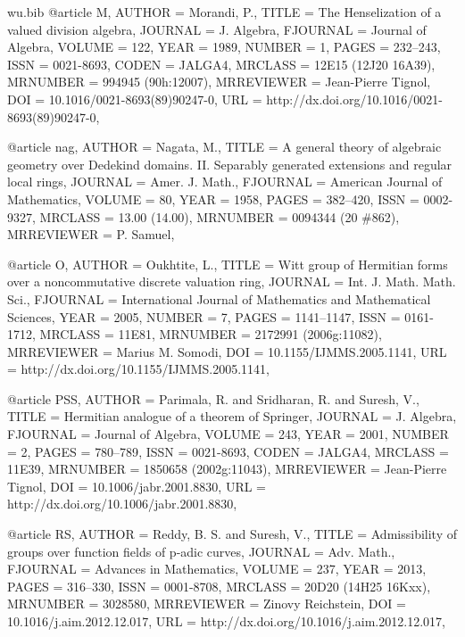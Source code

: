 \documentclass{amsart}
\numberwithin{equation}{section}
\theoremstyle{plain}
\theoremstyle{definition}
\begin{document}
\begin{filecontents}{wu.bib}
@article {M, 
    AUTHOR = {Morandi, P.},
     TITLE = {The {H}enselization of a valued division algebra},
   JOURNAL = {J. Algebra},
  FJOURNAL = {Journal of Algebra},
    VOLUME = {122},
      YEAR = {1989},
    NUMBER = {1},
     PAGES = {232--243},
      ISSN = {0021-8693},
     CODEN = {JALGA4},
   MRCLASS = {12E15 (12J20 16A39)},
  MRNUMBER = {994945 (90h:12007)},
MRREVIEWER = {Jean-Pierre Tignol},
       DOI = {10.1016/0021-8693(89)90247-0},
       URL = {http://dx.doi.org/10.1016/0021-8693(89)90247-0},
}

@article {nag,
    AUTHOR = {Nagata, M.},
     TITLE = {A general theory of algebraic geometry over {D}edekind
              domains. {II}. {S}eparably generated extensions and regular
              local rings},
   JOURNAL = {Amer. J. Math.},
  FJOURNAL = {American Journal of Mathematics},
    VOLUME = {80},
      YEAR = {1958},
     PAGES = {382--420},
      ISSN = {0002-9327},
   MRCLASS = {13.00 (14.00)},
  MRNUMBER = {0094344 (20 \#862)},
MRREVIEWER = {P. Samuel},
}

@article {O, 
    AUTHOR = {Oukhtite, L.},
     TITLE = {Witt group of {H}ermitian forms over a noncommutative discrete
              valuation ring},
   JOURNAL = {Int. J. Math. Math. Sci.},
  FJOURNAL = {International Journal of Mathematics and Mathematical
              Sciences},
      YEAR = {2005},
    NUMBER = {7},
     PAGES = {1141--1147},
      ISSN = {0161-1712},
   MRCLASS = {11E81},
  MRNUMBER = {2172991 (2006g:11082)},
MRREVIEWER = {Marius M. Somodi},
       DOI = {10.1155/IJMMS.2005.1141},
       URL = {http://dx.doi.org/10.1155/IJMMS.2005.1141},
}

@article {PSS, 
    AUTHOR = {Parimala, R. and Sridharan, R. and Suresh, V.},
     TITLE = {Hermitian analogue of a theorem of {S}pringer},
   JOURNAL = {J. Algebra},
  FJOURNAL = {Journal of Algebra},
    VOLUME = {243},
      YEAR = {2001},
    NUMBER = {2},
     PAGES = {780--789},
      ISSN = {0021-8693},
     CODEN = {JALGA4},
   MRCLASS = {11E39},
  MRNUMBER = {1850658 (2002g:11043)},
MRREVIEWER = {Jean-Pierre Tignol},
       DOI = {10.1006/jabr.2001.8830},
       URL = {http://dx.doi.org/10.1006/jabr.2001.8830},
}

@article {RS, 
    AUTHOR = {Reddy, B. S. and Suresh, V.},
     TITLE = {Admissibility of groups over function fields of p-adic curves},
   JOURNAL = {Adv. Math.},
  FJOURNAL = {Advances in Mathematics},
    VOLUME = {237},
      YEAR = {2013},
     PAGES = {316--330},
      ISSN = {0001-8708},
   MRCLASS = {20D20 (14H25 16Kxx)},
  MRNUMBER = {3028580},
MRREVIEWER = {Zinovy Reichstein},
       DOI = {10.1016/j.aim.2012.12.017},
       URL = {http://dx.doi.org/10.1016/j.aim.2012.12.017},
}


\end{filecontents}
\end{document}
